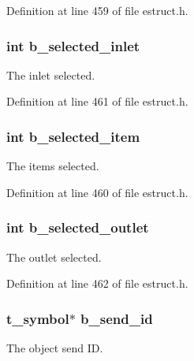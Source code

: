 Definition at line 459 of file estruct.\-h.

\hypertarget{struct__ebox_a0cebb4789c213079e0490e86c10c2893}{
\subsubsection[{b\-\_\-selected\-\_\-inlet}]{\setlength{\rightskip}{0pt plus 5cm}int b\-\_\-selected\-\_\-inlet}}\label{struct__ebox_a0cebb4789c213079e0490e86c10c2893}
The inlet selected. 

Definition at line 461 of file estruct.\-h.

\hypertarget{struct__ebox_a1f65b6d093e53fd85bed085ce0c5dd8e}{
\subsubsection[{b\-\_\-selected\-\_\-item}]{\setlength{\rightskip}{0pt plus 5cm}int b\-\_\-selected\-\_\-item}}\label{struct__ebox_a1f65b6d093e53fd85bed085ce0c5dd8e}
The items selected. 

Definition at line 460 of file estruct.\-h.

\hypertarget{struct__ebox_acbf0482cb9c6e192e2059775acc1ac86}{
\subsubsection[{b\-\_\-selected\-\_\-outlet}]{\setlength{\rightskip}{0pt plus 5cm}int b\-\_\-selected\-\_\-outlet}}\label{struct__ebox_acbf0482cb9c6e192e2059775acc1ac86}
The outlet selected. 

Definition at line 462 of file estruct.\-h.

\hypertarget{struct__ebox_ac59460230e622f821660b599e2f96ca9}{
\subsubsection[{b\-\_\-send\-\_\-id}]{\setlength{\rightskip}{0pt plus 5cm}t\-\_\-symbol$\ast$ b\-\_\-send\-\_\-id}}\label{struct__ebox_ac59460230e622f821660b599e2f96ca9}
The object send I\-D. 

